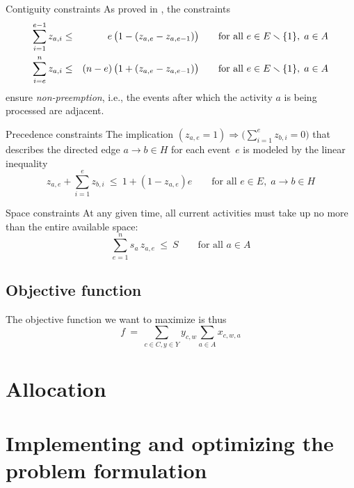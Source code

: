 \documentclass[11pt,reqno]{amsart}
\newcommand{\lra}{\longrightarrow}
\numberwithin{equation}{section}
\begin{document}
\begin{mydesc}
\item[Contiguity constraints] As proved in \cite[Proposition 1]{artigues-etal11a}, the
  constraints
  \begin{eqnarray}
    \sum_{i=1}^{e-1} z_{a,i}
    &\le&
    \phantom{(n-e)}\llap{$e$}\,\big(1-(z_{a,e} - z_{a,e-1})\big)
    \qquad\text{for all } e\in E\smallsetminus\{1\},\; a\in A
    \\
    \sum_{i=e}^n z_{a,i}
    &\le&
    (n-e)\,\big(1+(z_{a,e} - z_{a,e-1})\big)
    \qquad\text{for all } e\in E\smallsetminus\{1\},\; a\in A
  \end{eqnarray}
  ensure \emph{non-preemption}, i.e., the events after which the activity $a$ is being
  processed are adjacent.

\item[Precedence constraints] The implication $(z_{a,e}=1) \Longrightarrow
  \big(\sum_{i=1}^{e} z_{b,i}=0\big)$ that describes the directed edge $a\lra b\in H$ for
  each event~$e$ is modeled by the linear inequality
  \begin{equation}
     z_{a,e} + \sum_{i=1}^e z_{b,i}
     \ \le \
     1+(1-z_{a,e})e
     \qquad\text{for all } e\in E,\; a\lra b\in H
  \end{equation}

\item[Space constraints] At any given time, all current activities must take up no more
  than the entire available space:
  \begin{equation}
    \sum_{e=1}^n s_a \, z_{a,e} 
    \ \le \
    S \qquad\text{for all } a\in A
  \end{equation}
\end{mydesc}

\subsection{Objective function}

The objective function we want to  maximize is thus
\[
   f 
   \ = \
   \sum_{c\in C, y\in Y} y_{c,w} \sum_{a\in A} x_{c,w,a}
\]


\section{Allocation}


\section{Implementing and optimizing the problem formulation}
\end{document}
